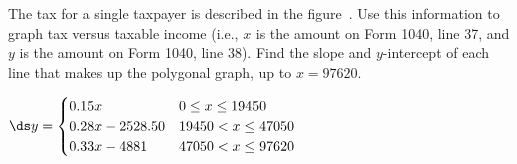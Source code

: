 \begin{exercises}
\begin{exercise}
The tax for a single taxpayer is described in the
figure~. Use this
information to graph tax versus taxable income (i.e., $x$ is the
amount on Form 1040, line 37, and $y$ is the amount on Form 1040, line 38).
Find the slope and $y$-intercept of each line that makes up the polygonal
graph, up to $x=97620$.
\begin{answer} $\ds y=\begin{cases} 0.15x & 0\le x\le 19450 \\
0.28x-2528.50&  19450<x\le 47050 \\
0.33x-4881 & 47050<x\le 97620 \\
\end{cases}$
\end{answer}\end{exercise}



\end{exercises}
